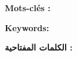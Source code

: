 


\medskip
\textbf{Mots-clés :} %

\clearpage



\medskip
\textbf{Keywords:} %

\clearpage


\begin{Arabic}
\end{Arabic}

\medskip
\textbf{الكلمات المفتاحية :}
\begin{Arabic}
\end{Arabic}

\clearpage